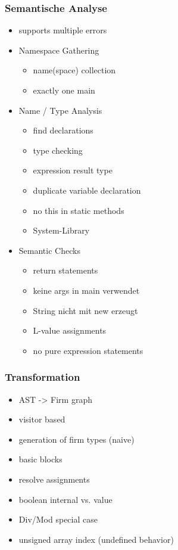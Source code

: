 \documentclass[navbaroff,en]{sdqbeamer}
\begin{document}
\begin{frame}
    \frametitle{Semantische Analyse}

    \begin{itemize}
        \item supports multiple errors
        \vspace{1em}
        \item Namespace Gathering
        \begin{itemize}
            \item name(space) collection
            \item exactly one main
        \end{itemize}
        \item Name / Type Analysis
        \begin{itemize}
            \item find declarations
            \item type checking
            \item expression result type
            \item duplicate variable declaration
            \item no this in static methods
            \item System-Library
        \end{itemize}
        \item Semantic Checks
        \begin{itemize}
            \item return statements
            \item keine args in main verwendet
            \item String nicht mit new erzeugt
            \item L-value assignments
            \item no pure expression statements
        \end{itemize}
    \end{itemize}

\end{frame}

\begin{frame}
    \frametitle{Transformation}

    \begin{itemize}
        \item AST -> Firm graph
        \item visitor based
        \item generation of firm types (naive)
        \item basic blocks
        \item resolve assignments
        \item boolean internal vs. value
        \item Div/Mod special case
        \item unsigned array index (undefined behavior)
    \end{itemize}

\end{frame}
\end{document}
